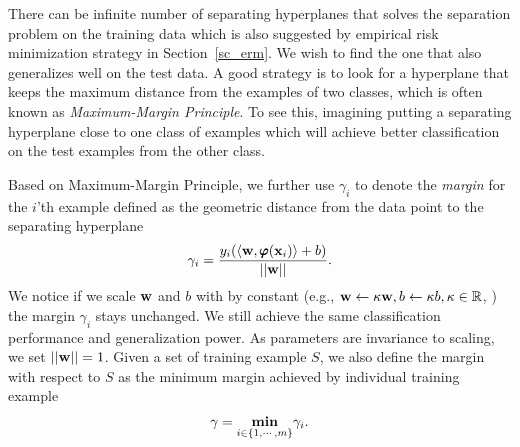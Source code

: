 {There can be infinite number of separating hyperplanes that solves the separation problem on the training data which is also suggested by empirical risk minimization strategy in Section~\ref{sc_erm}. 
We wish to find the one that also generalizes well on the test data.
A good strategy is to look for a hyperplane that keeps the maximum distance from the examples of two classes, which is often known as \textit{Maximum-Margin Principle}.
To see this, imagining putting a separating hyperplane close to one class of examples which will achieve better classification on the test examples from the other class.

Based on Maximum-Margin Principle, we further use $\gamma_i$ to denote the \textit{margin} for the $i$'th example defined as the geometric distance from the data point to the separating hyperplane
\begin{align*}
	\gamma_i = \frac{y_i(\langle \mathbf {w}, \pmb \varphi(\mathbf {x}_i) \rangle+b)}{\left|\left| \mathbf {w} \right|\right|}.
\end{align*}
We notice if we scale $\mathbf {w}$ and $b$ with by constant (e.g., $\mathbf {w}\leftarrow\kappa\mathbf {w}, b\leftarrow\kappa b, \kappa\in\mathbb{R}$, ) the margin $\gamma_i$ stays unchanged. 
We still achieve the same classification performance and generalization power.
As parameters are invariance to scaling, we set $\left|\left| \mathbf {w} \right|\right|=1$.
Given a set of training example $S$, we also define the margin with respect to $S$ as the minimum margin achieved by individual training example
\begin{align*}
	\gamma = \underset{i\in\{1,\cdots,m\}}{\textbf{min}}\gamma_i.
\end{align*}

}
